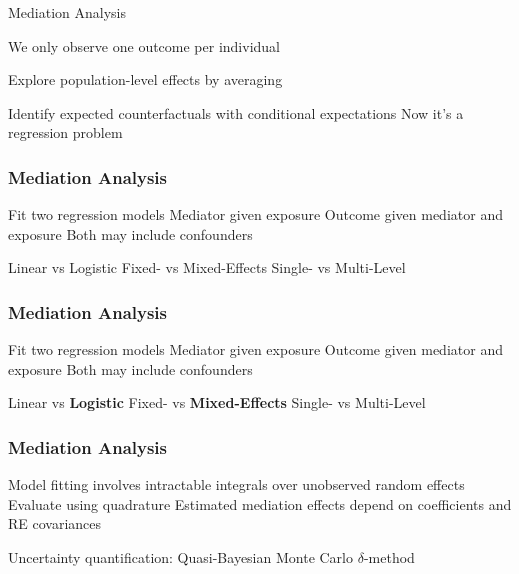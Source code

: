 \documentclass[14pt]{beamer}
\begin{document}
\begin{frame}{Mediation Analysis}
    \begin{outline}
        \1 We only observe one outcome per individual\newline

        \1 Explore population-level effects by averaging\newline

        \1 Identify expected counterfactuals with conditional expectations
            \2 Now it's a regression problem
    \end{outline}
\end{frame}


\begin{frame}
    \frametitle{Mediation Analysis}
    \begin{outline}
        \1 Fit two regression models
            \2 Mediator given exposure
            \2 Outcome given mediator and exposure
            \2 Both may include confounders \newline

        \1 Linear vs Logistic
        \1 Fixed- vs Mixed-Effects
            \2 Single- vs Multi-Level
    \end{outline}
\end{frame}

\begin{frame}
    \frametitle{Mediation Analysis}
    \begin{outline}
        \1 Fit two regression models
            \2 Mediator given exposure
            \2 Outcome given mediator and exposure
            \2 Both may include confounders \newline

        \1 Linear vs \textbf{Logistic}
        \1 Fixed- vs \textbf{Mixed-Effects}
            \2 Single- vs Multi-Level
    \end{outline}
\end{frame}


\begin{frame}
    \frametitle{Mediation Analysis}
    \begin{outline}
        \1 Model fitting involves intractable integrals over unobserved random effects
            \2 Evaluate using quadrature 
        \1 Estimated mediation effects depend on coefficients and RE covariances\newline

        \1 Uncertainty quantification:
            \2 Quasi-Bayesian Monte Carlo
            \2 $\delta$-method
    \end{outline}
\end{frame}
\end{document}
